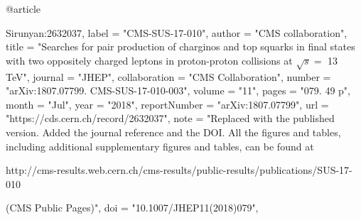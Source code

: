 @article{Sirunyan:2632037,
      label          = "CMS-SUS-17-010",
      author        = "{CMS collaboration}",
      title         = "{Searches for pair production of charginos and top squarks
                       in final states with two oppositely charged leptons in
                       proton-proton collisions at $\sqrt{s} = $ 13 TeV}",
      journal       = "JHEP",
      collaboration = "CMS Collaboration",
      number        = "arXiv:1807.07799. CMS-SUS-17-010-003",
      volume        = "11",
      pages         = "079. 49 p",
      month         = "Jul",
      year          = "2018",
      reportNumber  = "arXiv:1807.07799",
      url           = "https://cds.cern.ch/record/2632037",
      note          = "Replaced with the published version. Added the journal
                       reference and
  the DOI. All the figures and tables,
                       including additional supplementary
  figures and tables,
                       can be found at
 
                       http://cms-results.web.cern.ch/cms-results/public-results/publications/SUS-17-010

                        (CMS Public Pages)",
      doi           = "10.1007/JHEP11(2018)079",
}

